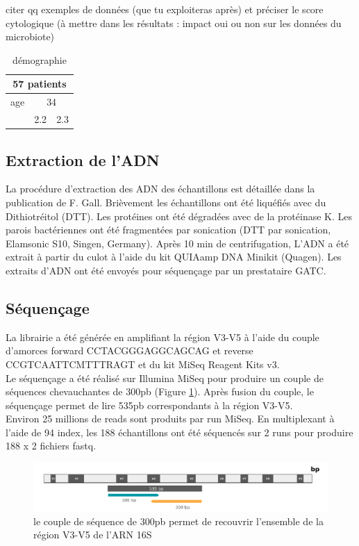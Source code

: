 \documentclass[12pt,a4paper]{article}
\begin{document}
citer qq exemples de données (que tu exploiteras après) et préciser le score
cytologique (à mettre dans les résultats : impact oui ou non sur les données du microbiote)

\begin{table}[h]
\centering
   \caption{démographie}
   \begin{tabular}{|l|c|c}
        \hline
   \multicolumn{3}{|c|}{     57 patients     } \\
    \hline
    age & \multicolumn{2}{|c|}{34}  \\
    \hline

        & 2.2 & 2.3 \\
    \hline
   \end{tabular}
\end{table}

\subsection{Extraction de l’ADN}

La procédure d'extraction des ADN des échantillons est détaillée dans la publication de  F. Gall\cite{LeGall}. Brièvement les échantillons ont été liquéfiés avec du Dithiotréitol (DTT). Les protéines ont été dégradées avec de la protéinase K.
Les parois bactériennes ont été fragmentées par sonication (DTT par sonication, Elamsonic S10, Singen, Germany). Après 10 min de centrifugation, L’ADN a été extrait à partir du culot à l'aide du kit QUIAamp DNA Minikit (Quagen).
Les extraits d’ADN ont été envoyés pour séquençage par un prestataire GATC.

\subsection{Séquençage}
La librairie a été générée en amplifiant la région V3-V5 à l’aide du couple d’amorces forward CCTACGGGAGGCAGCAG et reverse CCGTCAATTCMTTTRAGT et du kit MiSeq Reagent Kits v3. \\
Le séquençage a été réalisé sur Illumina MiSeq pour produire un couple de séquences chevauchantes de 300pb (Figure \ref{illumina}). Après fusion du couple, le séquençage permet de lire  535pb correspondants à la région V3-V5.\\
Environ 25 millions de reads sont produits par run MiSeq. En multiplexant à l’aide de 94 index, les 188 échantillons ont été séquencés sur 2 runs pour produire 188 x 2 fichiers fastq.

\begin{figure}[ht]
\begin{center}
\includegraphics[scale=0.6]{img/illumina.png}\hfill
\end{center}
\caption{le couple de séquence de 300pb permet de recouvrir l'ensemble de la région V3-V5 de l'ARN 16S}
\label{illumina}
\end{figure}
\end{document}
